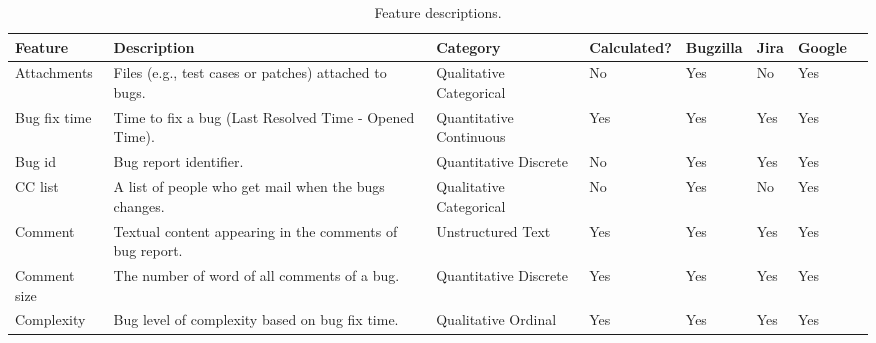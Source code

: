 \begin{table}[h!]
  \centering
  \caption{Feature descriptions.}
  \begin{tabular}{@{}lp{6cm}llllll@{}}
    \toprule
    \textbf{Feature}                      & \textbf{Description}                  & \textbf{Category}                     & \textbf{Calculated}?                  & \textbf{Bugzilla}                     & 
    \textbf{Jira}                         & 
    \textbf{Google}\\
    \midrule
    Attachments                  & Files (e.g., test cases or patches) attached to bugs.                                                                                                  & Qualitative Categorical            & No          &      Yes    &   No   & Yes\\
    Bug fix time                 & Time to fix a bug (Last Resolved Time - Opened Time).                                                                                                & Quantitative Continuous & Yes         &     Yes    &  Yes    &  Yes\\
    Bug id                       & Bug report identifier.                                                                                                                               & Quantitative Discrete  & No          &       Yes   &   Yes   & Yes\\
    CC list                      & A list of people who get mail when the bugs changes.                                                                                                 & Qualitative Categorical            & No          &       Yes   &    No  & Yes\\
    Comment                      & Textual content appearing in the comments of bug report.                                                                                             & Unstructured Text            & Yes         &       Yes   &    Yes  &  Yes\\
    Comment size                 & The number of word of all comments of a bug.                                                                                                         & Quantitative Discrete  & Yes         &      Yes    &    Yes  & Yes\\
    Complexity                   & Bug level of complexity based on bug fix time.                                                                                                       & Qualitative Ordinal           & Yes         &      Yes    &    Yes  & Yes\\

\end{tabular}
\end{table}

